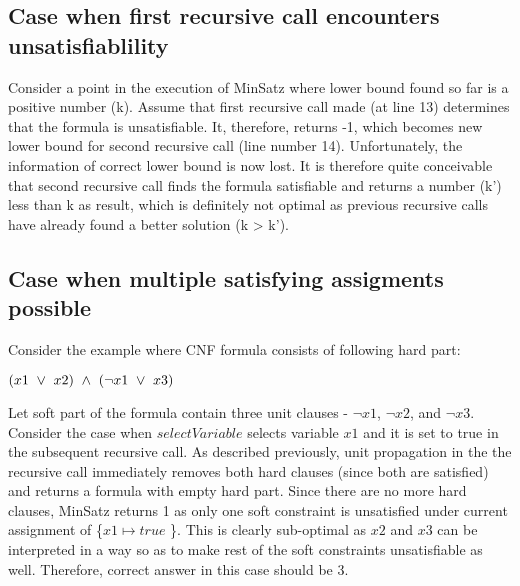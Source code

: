 \subsection {Case when first recursive call encounters unsatisfiablility}
Consider a point in the execution of MinSatz where lower bound found so far is a
positive number (k). Assume that first recursive call made (at line 13)
determines that the formula is unsatisfiable. It, therefore, returns -1, which
becomes new lower bound for second recursive call (line number 14).
Unfortunately, the information of correct lower bound is now lost. It is
therefore quite conceivable that second recursive call finds the formula
satisfiable and returns a number (k') less than k as result, which is definitely
not optimal as previous recursive calls have already found a better solution (k > k').

\subsection {Case when multiple satisfying assigments possible}
Consider the example where CNF formula consists of following hard part:
\begin{center}
  \(
    (x1 ~\vee~ x2) ~\wedge~ (\neg x1 ~\vee~ x3) 
  \)
\end{center}
Let soft part of the formula contain three unit clauses - $\neg x1$, $\neg x2$,
and $\neg x3$. Consider the case when $selectVariable$ selects variable $x1$ and
it is set to true in the subsequent recursive call. As described previously,
unit propagation in the the recursive call immediately removes both hard clauses
(since both are satisfied) and returns a formula with empty hard part. Since
there are no more hard clauses, MinSatz returns 1 as only one soft constraint is
unsatisfied under current assignment of \{$x1 \mapsto true$ \}. This is clearly
sub-optimal as $x2$ and $x3$ can be interpreted in a way so as to make rest of
the soft constraints unsatisfiable as well. Therefore, correct answer in this
case should be 3.


